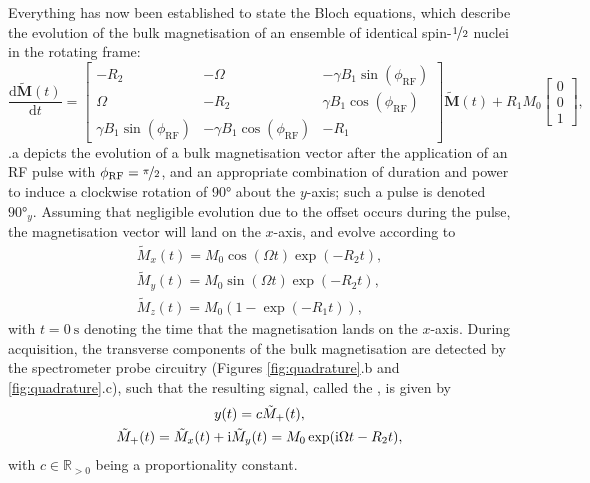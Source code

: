 Everything has now been established to state the Bloch equations, which
describe the evolution of the bulk magnetisation of an ensemble of identical
spin-$\nicefrac{1}{2}$ nuclei in the rotating frame:
\begin{equation}
    \frac{\mathrm{d}\tilde{\symbf{M}}(t)}{\mathrm{d}t} =
    \begin{bmatrix}
        -R_2 & -\Omega & -\gamma B_1 \sin(\phi_{\text{RF}}) \\
        \Omega & -R_2 & \gamma B_1 \cos(\phi_{\text{RF}}) \\
        \gamma B_1 \sin(\phi_{\text{RF}}) & -\gamma B_1 \cos(\phi_{\text{RF}}) & -R_1
    \end{bmatrix}
    \tilde{\symbf{M}}(t)
    + R_1 M_0
    \begin{bmatrix}
        0 \\ 0 \\ 1
    \end{bmatrix},
\end{equation}
.a depicts the
evolution of a bulk magnetisation vector after the application of an
\ac{RF} pulse with $\phi_{\text{RF}} = \nicefrac{\pi}{2}$, and an appropriate
combination of duration and power to induce a clockwise rotation of \ang{90}
about the $y$-axis; such a pulse is denoted $\ang{90}_{y}$.
Assuming that negligible evolution due to the offset occurs during the pulse,
the magnetisation vector will land on the $x$-axis, and evolve according to
\begin{subequations}
    \begin{gather}
        \tilde{M}_x(t) = M_0 \cos(\Omega t) \exp(-R_2 t),\\
        \tilde{M}_y(t) = M_0 \sin(\Omega t) \exp(-R_2 t),\\
        \tilde{M}_z(t) = M_0 (1 - \exp(-R_1 t)),
    \end{gather}
\end{subequations}
with $t=\qty{0}{\second}$ denoting the time that the magnetisation lands on the
$x$-axis.
During acquisition, the transverse components of the bulk magnetisation are
detected by the spectrometer probe circuitry
(Figures \ref{fig:quadrature}.b and \ref{fig:quadrature}.c), such that the
resulting signal, called the , is given by
\begin{subequations}
    \begin{gather}
        y(t) = c \tilde{M}_+(t),\\
        \tilde{M}_+(t) = \tilde{M}_x (t) + \mathrm{i} \tilde{M}_y (t) = M_0 \exp(\mathrm{i} \Omega t - R_2 t),
    \end{gather}
\end{subequations}
with $c \in \mathbb{R}_{>0}$ being a proportionality constant.


